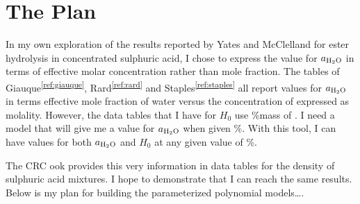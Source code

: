 \documentclass[]{tufte-handout}
\newcommand{\tss}[1]{\textsuperscript{#1}}
\begin{document}
\clearpage
\section{The Plan}

In my own exploration of the results reported by Yates and McClelland for ester hydrolysis
in concentrated sulphuric acid, I chose to express the value for $a_{\ce{H2O}}$ in terms of effective molar concentration rather than mole fraction. The tables of Giauque\tss{\ref{ref:giauque}}, Rard\tss{\ref{ref:rard}} and Staples\tss{\ref{ref:staples}} all report values for $a_{\ce{H2O}}$ in terms effective mole fraction of water versus the concentration of  expressed as molality. However, the data tables that I have for $H_0$ use \%mass of . I need a model that will give me a value for $a_{\ce{H2O}}$ when given \%. With this tool, I can have values for both $a_{\ce{H2O}}$ and $H_0$ at any given value of \%. 

The CRC 	ook
provides this very information in data tables for the density of sulphuric acid mixtures. I hope to demonstrate that I can reach the same results.  Below is my plan for building the parameterized polynomial models\ldots.  
\end{document}
